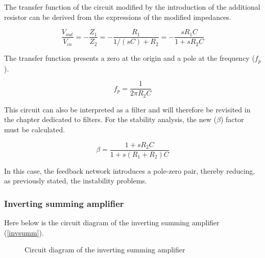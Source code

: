 \documentclass[../main.tex]{subfiles}
\begin{document}
The transfer function of the circuit modified by the introduction of the additional resistor can be derived from the expressions of the modified impedances.

\begin{equation}
	\frac{V_{out}}{V_{in}} = - \frac{Z_1}{Z_2} = - \frac{R_1}{1 / (sC) + R_2} = - \frac{sR_1C}{1+sR_2C}
\end{equation}

The transfer function presents a zero at the origin and a pole at the frequency ($f_p$).


\begin{equation}
	f_p = \frac{1}{2\pi R_2C}
\end{equation}

This circuit can also be interpreted as a filter and will therefore be revisited in the chapter dedicated to filters. For the stability analysis, the new ($\beta$) factor must be calculated.

\begin{equation}
	\beta = \frac{1 + sR_2C}{1 + s(R_1 + R_2)C}
\end{equation}


In this case, the feedback network introduces a pole-zero pair, thereby reducing, as previously stated, the instability problems.


\subsubsection{Inverting summing amplifier}

Here below is the circuit diagram of the inverting summing amplifier (\autoref{invsumm}).

\begin{figure}[h!]
\begin{center}


\caption{Circuit diagram of the inverting summing amplifier}	
\label{invsumm}
\end{center}	
\end{figure}
\end{document}
